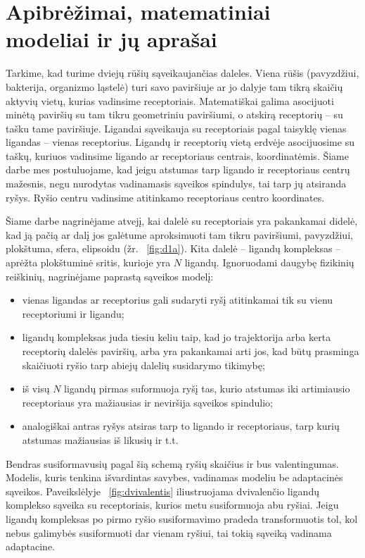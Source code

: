 \documentclass[10pt]{article}
\begin{document}
\section{Apibrėžimai, matematiniai modeliai ir jų aprašai}

Tarkime, kad turime dviejų rūšių sąveikaujančias daleles. Viena rūšis (pavyzdžiui, bakterija, organizmo ląstelė) turi savo paviršiuje ar jo dalyje tam tikrą skaičių aktyvių vietų, kurias  vadinsime receptoriais. Matematiškai galima asocijuoti minėtą paviršių su tam tikru geometriniu paviršiumi, o atskirą receptorių --  su tašku tame paviršiuje. Ligandai  sąveikauja su receptoriais pagal taisyklę vienas ligandas -- vienas receptorius.  Ligandų ir receptorių vietą erdvėje asocijuosime su taškų, kuriuos vadinsime ligando ar receptoriaus centrais, koordinatėmis. Šiame darbe mes postuluojame, kad jeigu atstumas tarp ligando ir receptoriaus centrų mažesnis, negu nurodytas vadinamasis sąveikos spindulys, tai tarp jų atsiranda ryšys. Ryšio centru vadinsime atitinkamo receptoriaus centro koordinates.


Šiame darbe  nagrinėjame atvejį, kai dalelė su receptoriais yra pakankamai didelė, kad  ją pačią  ar  dalį jos  galėtume aproksimuoti tam tikru paviršiumi, pavyzdžiui,  plokštuma, sfera, elipsoidu (žr. ~\ref{fig:d1a}).  Kita dalelė – ligandų kompleksas –  aprėžta plokštuminė sritis, kurioje yra $ N $  ligandų. Ignoruodami daugybę fizikinių  reiškinių, nagrinėjame paprastą  sąveikos  modelį: 
\begin{itemize}

\item vienas ligandas ar receptorius gali sudaryti ryšį atitinkamai tik su vienu receptoriumi ir ligandu;

\item   ligandų kompleksas juda tiesiu keliu taip, kad jo trajektorija arba kerta receptorių dalelės paviršių, arba yra pakankamai arti jos, kad būtų prasminga skaičiuoti  ryšio tarp abiejų dalelių susidarymo tikimybę;

\item iš visų $N$ ligandų pirmas suformuoja ryšį tas, kurio atstumas iki artimiausio receptoriaus yra  mažiausias ir neviršija sąveikos spindulio;

\item  analogiškai antras ryšys atsiras tarp to ligando ir receptoriaus, tarp kurių atstumas mažiausias iš likusių ir t.t.  
\end{itemize}
               
           
Bendras susiformavusių pagal šią schemą ryšių skaičius  ir bus valentingumas. Modelis, kuris tenkina išvardintas savybes, vadinamas modeliu  be adaptacinės sąveikos. Paveikslėlyje ~\ref{fig:dvivalentis} iliustruojama dvivalenčio ligandų komplekso sąveika su receptoriais, kurios metu susiformuoja  abu ryšiai. Jeigu ligandų kompleksas po pirmo ryšio susiformavimo pradeda transformuotis tol, kol nebus galimybės susiformuoti dar vienam ryšiui, tai tokią sąveiką vadinama  adaptacine.  
          
\end{document}
